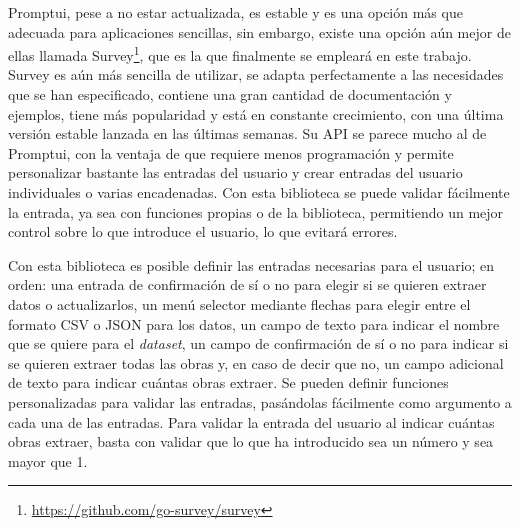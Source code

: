Promptui, pese a no estar actualizada, es estable y es una opción más que
adecuada para aplicaciones sencillas, sin embargo, existe una opción aún mejor
de ellas llamada Survey\footnote{\url{https://github.com/go-survey/survey}}, que
es la que finalmente se empleará en este trabajo. Survey es aún más sencilla de
utilizar, se adapta perfectamente a las necesidades que se han especificado,
contiene una gran cantidad de documentación y ejemplos, tiene más popularidad y
está en constante crecimiento, con una última versión estable lanzada en las
últimas semanas. Su API se parece mucho al de Promptui, con la ventaja
de que requiere menos programación y permite personalizar bastante las entradas
del usuario y crear entradas del usuario individuales o varias encadenadas. Con
esta biblioteca se puede validar fácilmente la entrada, ya sea con funciones
propias o de la biblioteca, permitiendo un mejor control sobre lo que introduce
el usuario, lo que evitará errores.

Con esta biblioteca es posible definir las entradas necesarias para el usuario;
en orden: una entrada de confirmación de sí o no para elegir si se quieren
extraer datos o actualizarlos, un menú selector mediante flechas para elegir
entre el formato CSV o JSON para los datos, un campo de texto para indicar el
nombre que se quiere para el \textit{dataset}, un campo de confirmación de sí o
no para indicar si se quieren extraer todas las obras y, en caso de decir que
no, un campo adicional de texto para indicar cuántas obras extraer. Se pueden
definir funciones personalizadas para validar las entradas, pasándolas
fácilmente como argumento a cada una de las entradas. Para validar la entrada
del usuario al indicar cuántas obras extraer, basta con validar que lo que ha
introducido sea un número y sea mayor que 1.

